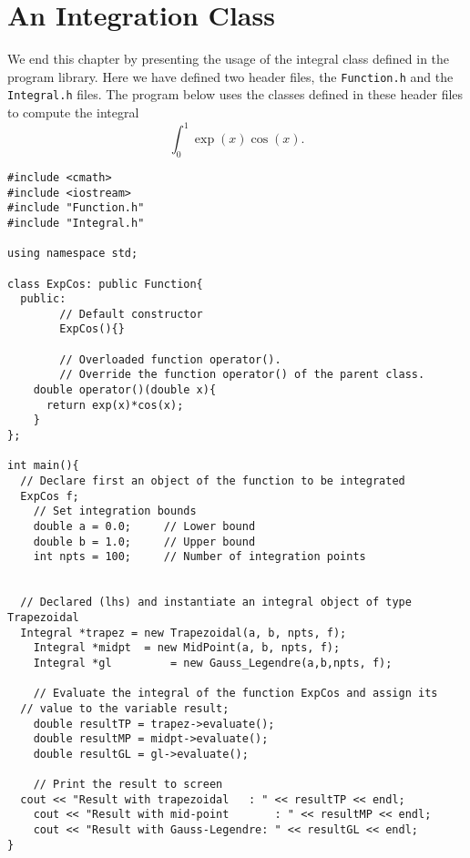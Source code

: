 \section{An Integration Class}
We end this chapter by presenting the usage of the integral class defined in the
program library. Here we have defined two header files, the \lstinline{Function.h}
and the \lstinline{Integral.h} files. The program below uses the classes defined in
these header files  to compute the  integral 
\[
\int_0^1 \exp{(x)}\cos{(x)}.
\]
\begin{lstlisting}
#include <cmath>
#include <iostream>
#include "Function.h"
#include "Integral.h"

using namespace std;

class ExpCos: public Function{
  public:
		// Default constructor
		ExpCos(){}
		
		// Overloaded function operator().
		// Override the function operator() of the parent class.
    double operator()(double x){
      return exp(x)*cos(x);
    }
};

int main(){
  // Declare first an object of the function to be integrated
  ExpCos f;
	// Set integration bounds
	double a = 0.0; 	// Lower bound
	double b = 1.0;		// Upper bound
	int npts = 100;		// Number of integration points
	
  
  // Declared (lhs) and instantiate an integral object of type Trapezoidal
  Integral *trapez = new Trapezoidal(a, b, npts, f);
	Integral *midpt  = new MidPoint(a, b, npts, f);
	Integral *gl		 = new Gauss_Legendre(a,b,npts, f);
	
	// Evaluate the integral of the function ExpCos and assign its 
  // value to the variable result;
	double resultTP = trapez->evaluate();
	double resultMP	= midpt->evaluate();
	double resultGL = gl->evaluate();
	
	// Print the result to screen
  cout << "Result with trapezoidal	 : " << resultTP << endl;
	cout << "Result with mid-point  	 : " << resultMP << endl;
	cout << "Result with Gauss-Legendre: " << resultGL << endl;
}
\end{lstlisting}


